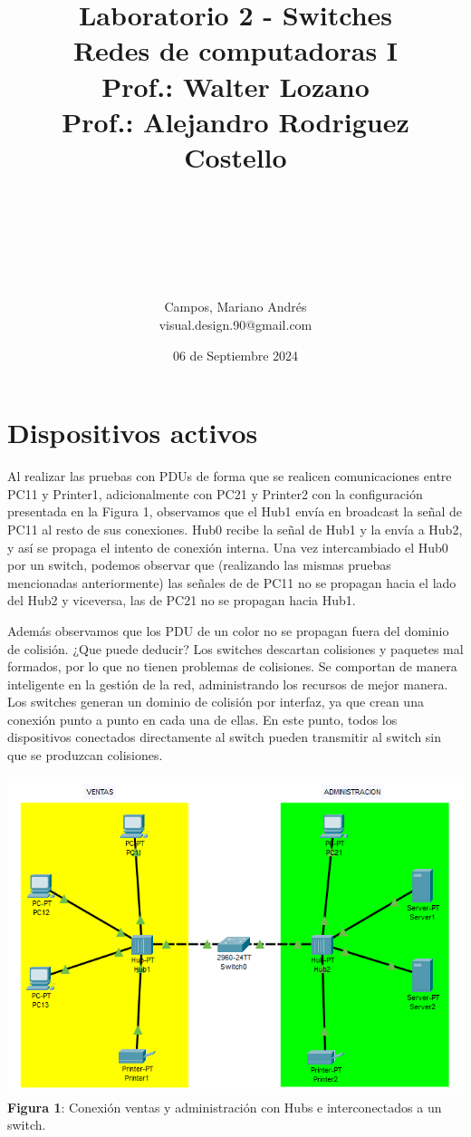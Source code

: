 \documentclass{article}
\title{\bfseries \huge Laboratorio 2 - Switches \normalsize{\linebreak\\Redes de computadoras I \\Prof.: Walter Lozano\\Prof.: Alejandro Rodriguez Costello}}
\author{\\\\\\\\\\\\Campos, Mariano Andrés \\ {\small visual.design.90@gmail.com}}
\date{\small 06 de Septiembre 2024}
\begin{document}
    \maketitle
    \newpage

    \section{Dispositivos activos}
    Al realizar las pruebas con PDUs de forma que se realicen comunicaciones entre PC11 y Printer1, adicionalmente con PC21 y Printer2 con la configuración presentada en la Figura 1, observamos que el Hub1 envía en broadcast la señal de PC11 al resto de sus conexiones. Hub0 recibe la señal de Hub1 y la envía a Hub2, y así se propaga el intento de conexión interna. 
    Una vez intercambiado el Hub0 por un switch, podemos observar que (realizando las mismas pruebas mencionadas anteriormente) las señales de de PC11 no se propagan hacia el lado del Hub2 y viceversa, las de PC21 no se propagan hacia Hub1.

    Además observamos que los PDU de un color no se propagan fuera del dominio de colisión.
    ¿Que puede deducir? 
    \linebreak
    Los switches descartan colisiones y paquetes mal formados, por lo que no tienen problemas de colisiones. Se comportan de manera inteligente en la gestión de la red, administrando los recursos de mejor manera. Los switches generan un dominio de colisión por interfaz, ya que crean una conexión punto a punto en cada una de ellas. En este punto, todos los dispositivos conectados directamente al switch pueden transmitir al switch sin que se produzcan colisiones.
    
    \begin{center}
        \includegraphics[width=0.85\linewidth]{img_02} 
        \linebreak
        \small {\bfseries Figura 1}: Conexión ventas y administración con Hubs e interconectados a un switch.
    \end{center}
    \pagebreak
    
\end{document}

